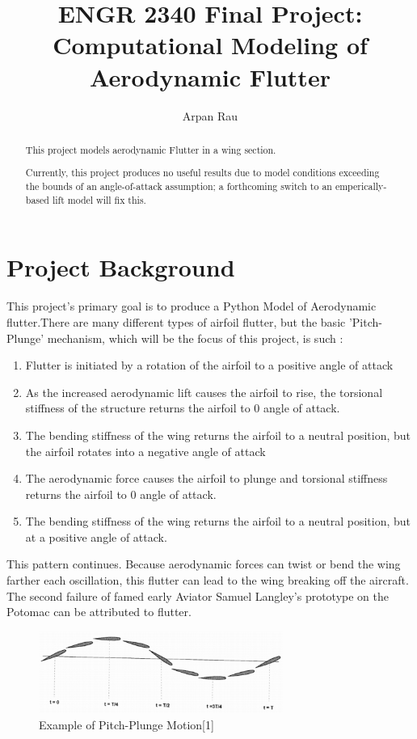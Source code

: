 \documentclass[]{article}
\title{ENGR 2340 Final Project: Computational Modeling of Aerodynamic Flutter}
\author{Arpan Rau}
\begin{document}
\maketitle

\begin{abstract}

This project models aerodynamic Flutter in a wing section. 

Currently, this project produces no useful results due to model conditions exceeding the bounds of an angle-of-attack assumption; a forthcoming switch to an emperically-based lift model will fix this. 


\end{abstract}

\section{Project Background}

This project's primary goal is to produce a Python Model of Aerodynamic flutter.There are many different types of airfoil flutter, but the basic 'Pitch-Plunge' mechanism, which will be the focus of this project, is such :

\begin{enumerate}
	\item Flutter is initiated by a rotation of the airfoil to a positive angle of attack
	\item As the increased aerodynamic lift causes the airfoil to rise, the torsional stiffness of the structure returns the airfoil to 0 angle of attack.
	\item The bending stiffness of the wing returns the airfoil to a neutral position, but the airfoil rotates into a negative angle of attack
	\item The aerodynamic force causes the airfoil to plunge and torsional stiffness returns the airfoil to 0 angle of attack.
	\item The bending stiffness of the wing returns the airfoil to a neutral position, but at a positive angle of attack.
\end{enumerate}

This pattern continues. Because aerodynamic forces can twist or bend the wing farther each oscillation, this flutter can lead to the wing breaking off the aircraft. The second failure of famed early Aviator Samuel Langley's prototype on the Potomac can be attributed to flutter. 

\begin{figure}[H]
	\includegraphics[width=8cm]{PitchPlunge}
	\centering
	\caption{Example of Pitch-Plunge Motion[1]}
\end{figure}
\end{document}
